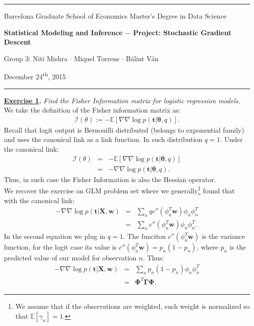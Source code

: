 \documentclass[a4paper, 11pt]{article}
\newcommand{\header}[4]{
	\begin{center}
		\rule{\linewidth}{0.5pt}
		
		{\small{#1}}
      
        \vspace{0.2in}
        
		{\large{#2}}
		
        \vspace{0.2in}
        
		{\small{#3}}
		
		\vspace{0.15in}
		
		{#4}
		
		\vspace{-0.1in}
		\rule{\linewidth}{0.6pt}
	\end{center}
}
\begin{document}
 
\header{\sc Barcelona Graduate School of Economics \hfill Master's Degree in Data Science}{\bf Statistical Modeling and Inference $-$ Project: Stochastic Gradient Descent}{\sc Group 3: Niti Mishra $\cdot$ Miquel Torrens $\cdot$ B\'alint V\'an}{December 24\textsuperscript{th}, 2015}
\textbf{\underline{Exercise 1}.} \textit{Find the Fisher Information matrix for logistic regression models.} \\
\newline We take the definition of the Fisher information matrix as:
\begin{eqnarray}
\mathcal{I}(\theta) := -\mathbb{E}[ \nabla \nabla \log p(\mathbf{t} | \mathbf{\theta}, q) ]. \nonumber
\end{eqnarray}
Recall that logit output is Bernouilli distributed (belongs to exponential family) and uses the canonical link as a link function. In such distribution $q=1$. Under the canonical link:
\begin{eqnarray}
\mathcal{I}(\theta) &=& -\mathbb{E}[ \nabla \nabla \log p(\mathbf{t} | \mathbf{\theta}, q) ] \nonumber \\
&=& - \nabla \nabla \log p(\mathbf{t} | \mathbf{\theta}, q). \nonumber
\end{eqnarray}
Thus, in such case the Fisher Information is also the Hessian operator.\\
\newline We recover the exercise on GLM problem set where we generally\footnote{We assume that if the observations are weighted, such weight is normalized so that $\mathbb{E}[\gamma_n] = 1$.} found that with the canonical link:
\begin{eqnarray}
- \nabla \nabla \log p(\mathbf{t} | \mathbf{X}, \mathbf{w}) &=& \sum_{n} q c''(\phi_n^T \mathbf{w}) \phi_n \phi_n^T \nonumber \\
&=& \sum_{n} c''(\phi_n^T \mathbf{w}) \phi_n \phi_n^T. \nonumber
\end{eqnarray}
In the second equation we plug in $q = 1$. The funciton $c''(\phi_n^T \mathbf{w})$ is the variance function, for the logit case its value is $c''(\phi_n^T \mathbf{w}) = p_n (1 - p_n)$, where $p_n$ is the predicted value of our model for observation $n$. Thus:
\begin{eqnarray}
- \nabla \nabla \log p(\mathbf{t} | \mathbf{X}, \mathbf{w}) &=& \sum_{n} p_n (1 - p_n) \phi_n \phi_n^T \nonumber \\
&=& \mathbf{\Phi}^T \mathbf{\Gamma} \mathbf{\Phi}, \nonumber
\end{eqnarray}
\end{document}

